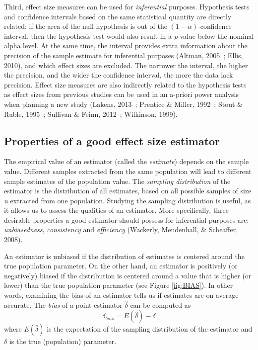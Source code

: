 \documentclass[
  12pt,
  french,
]{article}
\begin{document}
Third, effect size measures can be used for \emph{inferential} purposes.
Hypothesis tests and confidence intervals based on the same statistical
quantity are directly related: if the area of the null hypothesis is out
of the \((1-\alpha)\)-confidence interval, then the hypothesis test
would also result in a \emph{p}-value below the nominal alpha level. At
the same time, the interval provides extra information about the
precision of the sample estimate for inferential purposes (Altman,
2005~; Ellis, 2010), and which effect sizes are excluded. The narrower
the interval, the higher the precision, and the wider the confidence
interval, the more the data lack precision. Effect size measures are
also indirectly related to the hypothesis tests as effect sizes from
previous studies can be used in an a-priori power analysis when planning
a new study (Lakens, 2013~; Prentice \& Miller, 1992~; Stout \& Ruble,
1995~; Sullivan \& Feinn, 2012~; Wilkinson, 1999).

\hypertarget{properties-of-a-good-effect-size-estimator}{%
\subsection{Properties of a good effect size
estimator}\label{properties-of-a-good-effect-size-estimator}}

The empirical value of an estimator (called the \emph{estimate}) depends
on the sample value. Different samples extracted from the same
population will lead to different sample estimates of the population
value. The \emph{sampling distribution} of the estimator is the
distribution of all estimates, based on all possible samples of size
\emph{n} extracted from one population. Studying the sampling
distribution is useful, as it allows us to assess the qualities of an
estimator. More specifically, three desirable properties a good
estimator should possess for inferential purposes are:
\emph{unbiasedness}, \emph{consistency} and \emph{efficiency} (Wackerly,
Mendenhall, \& Scheaffer, 2008).

An estimator is unbiased if the distribution of estimates is centered
around the true population parameter. On the other hand, an estimator is
positively (or negatively) biased if the distribution is centered around
a value that is higher (or lower) than the true population parameter
(see Figure \ref{fig:BIAS}). In other words, examining the bias of an
estimator tells us if estimates are on average accurate. The \emph{bias}
of a point estimator \(\hat{\delta}\) can be computed as
\begin{equation} 
\delta_{bias}=E(\hat{\delta})-\delta
\label{eqn:BIAS}
\end{equation} where \(E(\hat{\delta})\) is the expectation of the
sampling distribution of the estimator and \(\delta\) is the true
(population) parameter.
\end{document}
